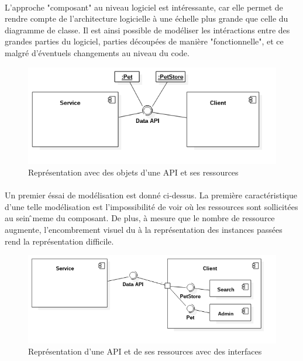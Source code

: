         \paragraph{}
            L'approche "composant" au niveau logiciel est intéressante, car elle permet de rendre compte
            de l'architecture logicielle à une échelle plus grande que celle du diagramme de classe.
            Il est ainsi possible de modéliser les intéractions entre des grandes parties du logiciel,
            parties découpées de manière "fonctionnelle", et ce malgré d'éventuels changements au niveau
            du code.

        \begin{figure}[ht]
            \centering
            \includegraphics[scale=0.6]{./assets/UML/component1.png}
            \caption{Représentation avec des objets d'une API et ses ressources}
        \end{figure}

        \newpage
        \paragraph{}
            Un premier éssai de modélisation est donné ci-dessus. La première caractéristique d'une telle
            modélisation est l'impossibilité de voir où les ressources sont sollicitées au sein ̂meme
            du composant. De plus, à mesure que le nombre de ressource augmente,  l'encombrement visuel
            du à la représentation des instances passées rend la représentation difficile.

        \begin{figure}[ht]
            \centering
            \includegraphics[scale=0.6]{./assets/UML/component2.png}
            \caption{Représentation d'une API et de ses ressources avec des interfaces}
        \end{figure}

